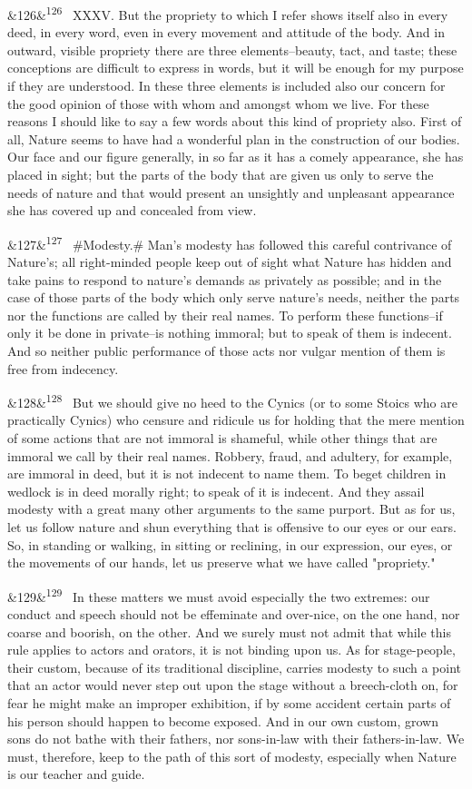 \documentclass[12pt]{article}
\newcommand{\para}[1][]{\par\noindent\ifx&#1&\else\textsuperscript{\footnotesize #1}~\fi}
\begin{document}
\para[126] XXXV. But the propriety to which I refer shows itself also in every deed, in every word, even in every movement and attitude of the body. And in outward, visible propriety there are three elements--beauty, tact, and taste; these conceptions are difficult to express in words, but it will be enough for my purpose if they are understood. In these three elements is included also our concern for the good opinion of those with whom and amongst whom we live. For these reasons I should like to say a few words about this kind of propriety also. First of all, Nature seems to have had a wonderful plan in the construction of our bodies. Our face and our figure generally, in so far as it has a comely appearance, she has placed in sight; but the parts of the body that are given us only to serve the needs of nature and that would present an unsightly and unpleasant appearance she has covered up and concealed from view.

\para[127] \#Modesty.\# Man's modesty has followed this careful contrivance of Nature's; all right-minded people keep out of sight what Nature has hidden and take pains to respond to nature's demands as privately as possible; and in the case of those parts of the body which only serve nature's needs, neither the parts nor the functions are called by their real names. To perform these functions--if only it be done in private--is nothing immoral; but to speak of them is indecent. And so neither public performance of those acts nor vulgar mention of them is free from indecency.

\para[128] But we should give no heed to the Cynics (or to some Stoics who are practically Cynics) who censure and ridicule us for holding that the mere mention of some actions that are not immoral is shameful, while other things that are immoral we call by their real names. Robbery, fraud, and adultery, for example, are immoral in deed, but it is not indecent to name them. To beget children in wedlock is in deed morally right; to speak of it is indecent. And they assail modesty with a great many other arguments to the same purport. But as for us, let us follow nature and shun everything that is offensive to our eyes or our ears. So, in standing or walking, in sitting or reclining, in our expression, our eyes, or the movements of our hands, let us preserve what we have called "propriety."

\para[129] In these matters we must avoid especially the two extremes: our conduct and speech should not be effeminate and over-nice, on the one hand, nor coarse and boorish, on the other. And we surely must not admit that while this rule applies to actors and orators, it is not binding upon us. As for stage-people, their custom, because of its traditional discipline, carries modesty to such a point that an actor would never step out upon the stage without a breech-cloth on, for fear he might make an improper exhibition, if by some accident certain parts of his person should happen to become exposed. And in our own custom, grown sons do not bathe with their fathers, nor sons-in-law with their fathers-in-law. We must, therefore, keep to the path of this sort of modesty, especially when Nature is our teacher and guide.
\end{document}
